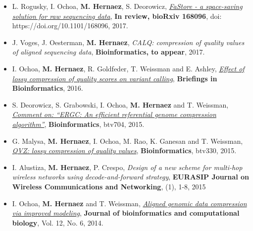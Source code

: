 \documentclass[11pt,a4paper,sans]{moderncv}        %
\begin{document}
\begin{itemize}

\item L. Rogusky, I. Ochoa, \textbf{M. Hernaez}, S. Deorowicz, \href{http://www.biorxiv.org/content/early/2017/07/25/168096}{\textsl{FaStore - a space-saving solution for raw sequencing data}}, \textbf{In review, bioRxiv 168096}, doi: https://doi.org/10.1101/168096, 2017.\\

\item J. Voges, J. Oesterman, \textbf{M. Hernaez}, {\textsl{CALQ: compression of quality values of aligned sequencing data}}, \textbf{Bioinformatics, to appear}, 2017.\\

\item I. Ochoa, \textbf{M. Hernaez}, R. Goldfeder, T. Weissman and E. Ashley, \href{http://web.stanford.edu/~iochoa/publishedPublications/2015_effectLossyCompression.pdf}{\textsl{ Effect of lossy compression of quality scores on variant calling}}, \textbf{ Briefings in Bioinformatics}, 2016.\\

\item S. Deorowicz, S. Grabowski, I. Ochoa, \textbf{M. Hernaez} and T. Weissman, \href{http://web.stanford.edu/~iochoa/publishedPublications/2015_ergc-comment.pdf}{\emph{ Comment on: ``ERGC: An efficient referential genome compression algorithm''}}, \textbf{Bioinformatics}, btv704, 2015.\\

\item G. Malysa, \textbf{M. Hernaez}, I. Ochoa, M. Rao, K. Ganesan and T. Weissman, \href{http://web.stanford.edu/~iochoa/publishedPublications/2015_qvz_paper.pdf}{\emph{ QVZ: lossy compression of quality values}}, \textbf{Bioinformatics}, btv330, 2015.\\

\item I. Alustiza, \textbf{M. Hernaez}, P. Crespo, {\emph{Design of a new scheme for multi-hop wireless networks using decode-and-forward strategy}}, \textbf{EURASIP Journal on Wireless Communications and Networking}, (1), 1-8, 2015\\

\item I. Ochoa, \textbf{M. Hernaez} and T. Weissman, \href{http://web.stanford.edu/~iochoa/publishedPublications/2014_cbc.pdf}{\emph{ Aligned genomic data compression via improved modeling}}, \textbf{Journal of bioinformatics and computational biology}, Vol. 12, No. 6, 2014.\\


\end{itemize}
\end{document}
